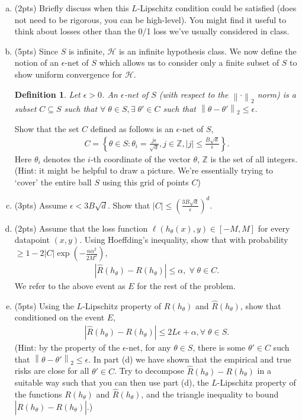 \documentclass[11pt]{article}
\newcommand{\calH}{{\mathcal{H}}}
\newcommand{\blue}[1]{{\color{blue}#1}}
\newcommand{\twonorm}[1]{\left\| #1\right\|_2}
\newtheorem{definition}[theorem]{Definition}
\begin{document}
\begin{enumerate}[(a)]
    \item (\blue{2pts})  Briefly discuss when this $L$-Lipschitz condition could be satisfied (does not need to be rigorous, you can be high-level). You might find it useful to think about losses other than the 0/1 loss we've usually considered in class. 
    \item (\blue{5pts}) Since $S$ is infinite, $\calH$ is an infinite hypothesis class. We now define the notion of an $\epsilon$-net of $S$ which allows us to consider only a finite subset of $S$ to show uniform convergence for $\calH$.
    \begin{definition}
    Let $\epsilon>0$. An $\epsilon$-net of $S$ (with respect to the $\twonorm{\cdot}$ norm) is a subset $C \subseteq S$ such that $\forall \; \theta \in S, \exists \; \theta' \in C$ such that $\twonorm{\theta-\theta'}\le \epsilon$.
    \end{definition}
    Show that the set $C$ defined as follows is an $\epsilon$-net of $S$,
    \begin{align*}
        C=\left\{ \theta \in S: \theta_i = \frac{j\epsilon}{\sqrt{d}}, j \in \mathbb{Z}, |j|\le \frac{B\sqrt{d}}{\epsilon} \right\} .
    \end{align*}
    Here $\theta_i$ denotes the $i$-th coordinate of the vector $\theta$, $\mathbb{Z}$ is the set of all integers. (Hint: it might be helpful to draw a picture. We're essentially trying to `cover' the entire ball $S$ using this grid of points $C$)
    \item (\blue{3pts}) Assume $\epsilon<3B\sqrt{d}$. Show that $|C|\le \left(\frac{3B\sqrt{d}}{\epsilon}\right)^d$. 
    \item (\blue{2pts}) Assume that the loss function $\ell(h_{\theta}(x),y)\in [-M,M]$ for every datapoint $(x,y)$. Using Hoeffding's inequality, show that with probability $\ge 1-2|C|\exp\left(-\frac{n\alpha^2}{2M^2} \right)$,
    \begin{align*}
        |\hat{R}(h_{\theta})-R(h_{\theta})| \le \alpha, \; \forall \; \theta\in C.
    \end{align*}
    We refer to the above event as $E$ for the rest of the problem.
    \item (\blue{5pts}) Using the $L$-Lipschitz property of $R(h_{\theta})$ and $\hat{R}(h_{\theta})$, show that conditioned on the event $E$,
    \begin{align}
     |\hat{R}(h_{\theta})-R(h_{\theta})| \le 2L\epsilon+\alpha, \forall \; \theta \in S.
    \end{align}
    (Hint: by the property of the $\epsilon$-net, for any $\theta \in S$, there is some $\theta' \in C$ such that $\twonorm{\theta-\theta'}\le \epsilon$. In part (d) we have shown that the empirical and true risks are close for all $\theta' \in C$. Try to decompose $\hat{R}(h_{\theta})-R(h_{\theta})$ in a suitable way such that you can then use part (d), the $L$-Lipschitz property of the functions $R(h_\theta)$ and $\hat{R}(h_\theta)$, and the triangle inequality to bound $|\hat{R}(h_{\theta})-R(h_{\theta})|$.)
    

\end{enumerate}
\end{document}
